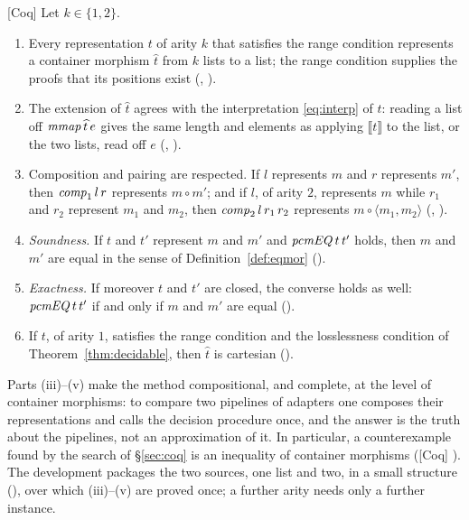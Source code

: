 \documentclass{fundam}
\begin{document}
\begin{theorem}\label{thm:bridge}
  \textsf{[Coq]}  Let $k \in \{1, 2\}$.
  \begin{enumerate}[label=(\roman*),leftmargin=2em]
  \item Every representation $t$ of arity $k$ that satisfies the range condition
    represents a container morphism $\widehat{t}$ from $k$ lists to a list; the range
    condition supplies the proofs that its positions exist (,
    ).
  \item The extension of $\widehat{t}$ agrees with the interpretation
    \eqref{eq:interp} of $t$: reading a list off $\mathit{mmap}\,\widehat{t}\,e$ gives the same
    length and elements as applying $\llbracket t \rrbracket$ to the list, or the two
    lists, read off $e$ (, ).
  \item Composition and pairing are respected.  If $l$ represents $m$ and $r$ represents
    $m'$, then $\mathit{comp}_1\,l\,r$ represents $m \circ m'$; and if $l$, of arity $2$,
    represents $m$ while $r_1$ and $r_2$ represent $m_1$ and $m_2$, then
    $\mathit{comp}_2\,l\,r_1\,r_2$ represents $m \circ \langle m_1, m_2 \rangle$
    (, ).
  \item \emph{Soundness.}  If $t$ and $t'$ represent $m$ and $m'$ and
    $\mathit{pcmEQ}\,t\,t'$ holds, then $m$ and $m'$ are equal in the sense of
    Definition~\ref{def:eqmor} ().
  \item \emph{Exactness.}  If moreover $t$ and $t'$ are closed, the converse holds as
    well: $\mathit{pcmEQ}\,t\,t'$ if and only if $m$ and $m'$ are equal
    ().
  \item If $t$, of arity $1$, satisfies the range condition and the losslessness condition
    of Theorem~\ref{thm:decidable}, then $\widehat{t}$ is cartesian
    ().
  \end{enumerate}
\end{theorem}

Parts (iii)--(v) make the method compositional, and complete, at the level of container
morphisms: to compare two pipelines of adapters one composes their representations and
calls the decision procedure once, and the answer is the truth about the pipelines, not
an approximation of it.  In particular, a counterexample found by the search of
\S\ref{sec:coq} is an inequality of container morphisms (\textsf{[Coq]}
).  The development packages the two sources, one list and two, in
a small structure (), over which (iii)--(v) are proved once; a further arity
needs only a further instance.
\end{document}
